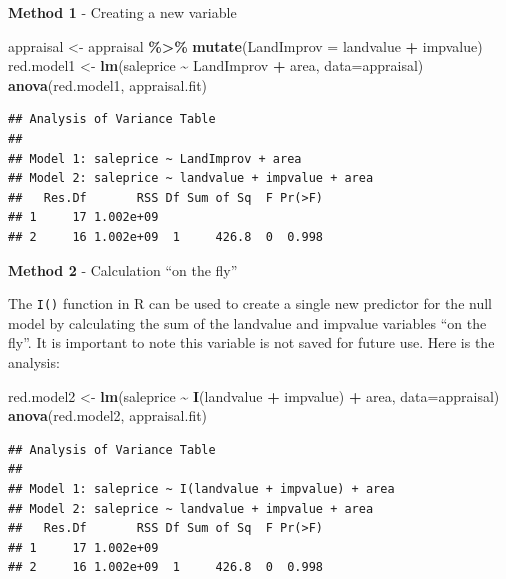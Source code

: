 \documentclass[
]{book}
\newenvironment{Shaded}{\begin{snugshade}}{\end{snugshade}}
\newcommand{\AttributeTok}[1]{\textcolor[rgb]{0.13,0.29,0.53}{#1}}
\newcommand{\FunctionTok}[1]{\textcolor[rgb]{0.13,0.29,0.53}{\textbf{#1}}}
\newcommand{\NormalTok}[1]{#1}
\newcommand{\OtherTok}[1]{\textcolor[rgb]{0.56,0.35,0.01}{#1}}
\newcommand{\SpecialCharTok}[1]{\textcolor[rgb]{0.81,0.36,0.00}{\textbf{#1}}}
\begin{document}
\textbf{Method 1} - Creating a new variable

\begin{Shaded}
\begin{Highlighting}[]
\NormalTok{appraisal }\OtherTok{\textless{}{-}}\NormalTok{ appraisal }\SpecialCharTok{\%\textgreater{}\%}
  \FunctionTok{mutate}\NormalTok{(}\AttributeTok{LandImprov =}\NormalTok{ landvalue }\SpecialCharTok{+}\NormalTok{ impvalue)}
\NormalTok{red.model1 }\OtherTok{\textless{}{-}} \FunctionTok{lm}\NormalTok{(saleprice }\SpecialCharTok{\textasciitilde{}}\NormalTok{ LandImprov }\SpecialCharTok{+}\NormalTok{ area, }\AttributeTok{data=}\NormalTok{appraisal)}
\FunctionTok{anova}\NormalTok{(red.model1, appraisal.fit)}
\end{Highlighting}
\end{Shaded}

\begin{verbatim}
## Analysis of Variance Table
## 
## Model 1: saleprice ~ LandImprov + area
## Model 2: saleprice ~ landvalue + impvalue + area
##   Res.Df       RSS Df Sum of Sq  F Pr(>F)
## 1     17 1.002e+09                       
## 2     16 1.002e+09  1     426.8  0  0.998
\end{verbatim}

\textbf{Method 2} - Calculation ``on the fly''

The \texttt{I()} function in R can be used to create a single new predictor for the null model by calculating the sum of the landvalue and impvalue variables ``on the fly''. It is important to note this variable is not saved for future use. Here is the analysis:

\begin{Shaded}
\begin{Highlighting}[]
\NormalTok{red.model2 }\OtherTok{\textless{}{-}} \FunctionTok{lm}\NormalTok{(saleprice }\SpecialCharTok{\textasciitilde{}} \FunctionTok{I}\NormalTok{(landvalue }\SpecialCharTok{+}\NormalTok{ impvalue) }\SpecialCharTok{+}\NormalTok{ area, }\AttributeTok{data=}\NormalTok{appraisal)}
\FunctionTok{anova}\NormalTok{(red.model2, appraisal.fit)}
\end{Highlighting}
\end{Shaded}

\begin{verbatim}
## Analysis of Variance Table
## 
## Model 1: saleprice ~ I(landvalue + impvalue) + area
## Model 2: saleprice ~ landvalue + impvalue + area
##   Res.Df       RSS Df Sum of Sq  F Pr(>F)
## 1     17 1.002e+09                       
## 2     16 1.002e+09  1     426.8  0  0.998
\end{verbatim}
\end{document}
